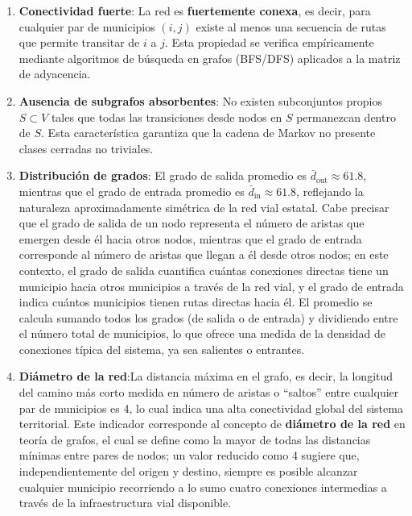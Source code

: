 \documentclass[
  spanish,
  us-letterpaper,
]{scrreprt}
\numberwithin{equation}{section}
\begin{document}
\begin{enumerate}
\def\labelenumi{\arabic{enumi}.}
\item
  \textbf{Conectividad fuerte}: La red es \textbf{fuertemente conexa},
  es decir, para cualquier par de municipios \((i,j)\) existe al menos
  una secuencia de rutas que permite transitar de \(i\) a \(j\). Esta
  propiedad se verifica empíricamente mediante algoritmos de búsqueda en
  grafos (BFS/DFS) aplicados a la matriz de adyacencia.
\item
  \textbf{Ausencia de subgrafos absorbentes}: No existen subconjuntos
  propios \(S \subset V\) tales que todas las transiciones desde nodos
  en \(S\) permanezcan dentro de \(S\). Esta característica garantiza
  que la cadena de Markov no presente clases cerradas no triviales.
\item
  \textbf{Distribución de grados}: El grado de salida promedio es
  \(\bar{d}_{\text{out}} \approx 61.8\), mientras que el grado de
  entrada promedio es \(\bar{d}_{\text{in}} \approx 61.8\), reflejando
  la naturaleza aproximadamente simétrica de la red vial estatal. Cabe
  precisar que el grado de salida de un nodo representa el número de
  aristas que emergen desde él hacia otros nodos, mientras que el grado
  de entrada corresponde al número de aristas que llegan a él desde
  otros nodos; en este contexto, el grado de salida cuantifica cuántas
  conexiones directas tiene un municipio hacia otros municipios a través
  de la red vial, y el grado de entrada indica cuántos municipios tienen
  rutas directas hacia él. El promedio se calcula sumando todos los
  grados (de salida o de entrada) y dividiendo entre el número total de
  municipios, lo que ofrece una medida de la densidad de conexiones
  típica del sistema, ya sea salientes o entrantes.
\item
  \textbf{Diámetro de la red}:La distancia máxima en el grafo, es decir,
  la longitud del camino más corto medida en número de aristas o
  ``saltos'' entre cualquier par de municipios es 4, lo cual indica una
  alta conectividad global del sistema territorial. Este indicador
  corresponde al concepto de \textbf{diámetro de la red} en teoría de
  grafos, el cual se define como la mayor de todas las distancias
  mínimas entre pares de nodos; un valor reducido como 4 sugiere que,
  independientemente del origen y destino, siempre es posible alcanzar
  cualquier municipio recorriendo a lo sumo cuatro conexiones
  intermedias a través de la infraestructura vial disponible.
\end{enumerate}
\end{document}

